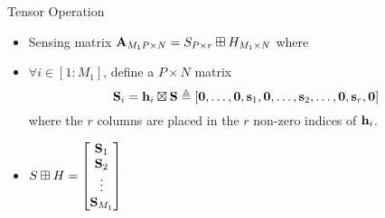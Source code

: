\begin{frame}{Tensor Operation}
\begin{itemize}
\item Sensing matrix $\mathbf{A}_{M_{1}P\times N}= S_{P\times r}\boxplus H_{M_{1}\times N}$ where
\vspace{2ex}
\item $\forall i\in [1:M_1]$, define a $P\times N$ matrix
\begin{equation*}
\mathbf{S}_i=\mathbf{h}_i \boxtimes \mathbf{S}\triangleq [\mathbf{0},\ldots,\mathbf{0},\mathbf{s}_1,\mathbf{0},\ldots,\mathbf{s}_2,\ldots,\mathbf{0},\mathbf{s}_r,\mathbf{0}]
\end{equation*}
where the $r$ columns are placed in the $r$ non-zero indices of $\mathbf{h}_i$.
\vspace{2ex}
\item $S\boxplus H=\begin{bmatrix}
\mathbf{S}_1\\
\mathbf{S}_2\\
\vdots\\
\mathbf{S}_{M_1}
\end{bmatrix}
$
\end{itemize}
\end{frame}

